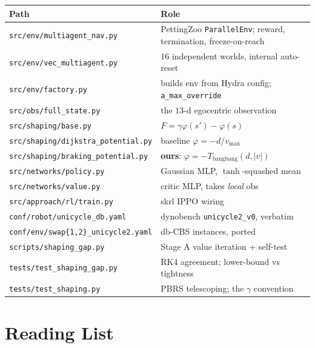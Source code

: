 \documentclass[11pt,a4paper]{article}
\newcommand{\code}[1]{\texttt{\small #1}}
\begin{document}
\begin{center}
\footnotesize
\begin{tabular}{ll}
\toprule
\textbf{Path} & \textbf{Role} \\
\midrule
\code{src/env/multiagent\_nav.py}     & PettingZoo \code{ParallelEnv}; reward, termination, freeze-on-reach \\
\code{src/env/vec\_multiagent.py}     & $16$ independent worlds, internal auto-reset \\
\code{src/env/factory.py}             & builds env from Hydra config; \code{a\_max\_override} \\
\code{src/obs/full\_state.py}         & the $13$-d egocentric observation \\
\code{src/shaping/base.py}            & $F = \gamma\varphi(s') - \varphi(s)$ \\
\code{src/shaping/dijkstra\_potential.py} & baseline $\varphi = -d/v_{\max}$ \\
\code{src/shaping/braking\_potential.py}  & \textbf{ours}: $\varphi = -T_{\text{bangbang}}(d,|v|)$ \\
\code{src/networks/policy.py}         & Gaussian MLP, $\tanh$-squashed mean \\
\code{src/networks/value.py}          & critic MLP, takes \emph{local} obs \\
\code{src/approach/rl/train.py}       & skrl IPPO wiring \\
\code{conf/robot/unicycle\_db.yaml}   & dynobench \code{unicycle2\_v0}, verbatim \\
\code{conf/env/swap\{1,2\}\_unicycle2.yaml} & db-CBS instances, ported \\
\code{scripts/shaping\_gap.py}        & Stage A value iteration + self-test \\
\code{tests/test\_shaping\_gap.py}    & RK4 agreement; lower-bound vs tightness \\
\code{tests/test\_shaping.py}         & PBRS telescoping; the $\gamma$ convention \\
\bottomrule
\end{tabular}
\end{center}

\section{Reading List}
\label{app:read}
\end{document}
